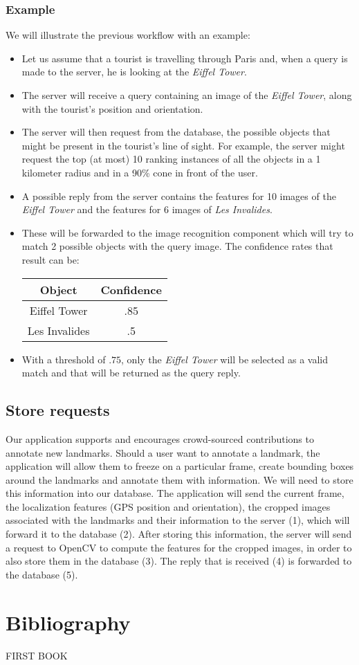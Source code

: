 \documentclass[a4paper,onecolumn,oneside,titlepage,11pt]{article}
\begin{document}
\subsubsection*{Example}
We will illustrate the previous workflow with an example:
\begin{itemize}
	\item Let us assume that a tourist is travelling through Paris and, when a query is made to the server, he is looking at the \emph{Eiffel Tower}.
	\item The server will receive a query containing an image of the \emph{Eiffel Tower}, along with the tourist's position and orientation. 
	\item The server will then request from the database, the possible objects that might be present in the tourist's line of sight. For example, the server might request the top (at most) 10 ranking instances of all the objects in a 1 kilometer radius and in a 90\% cone in front of the user.
	\item A possible reply from the server contains the features for 10 images of the \emph{Eiffel Tower} and the features for 6 images of \emph{Les Invalides}.
	\item These will be forwarded to the image recognition component which will try to match 2 possible objects with the query image. The confidence rates that result can be:
		\begin{center}
			\begin{tabular}{|c|c|}
				\hline
				\textbf{Object} & \textbf{Confidence}\\
				\hline
				Eiffel Tower & .85\\
				Les Invalides & .5\\
				\hline
			\end{tabular}
		\end{center}
	\item With a threshold of $.75$, only the \emph{Eiffel Tower} will be selected as a valid match and that will be returned as the query reply.
\end{itemize}

\subsection{Store requests}
Our application supports and encourages crowd-sourced contributions to annotate new landmarks. Should a user want to annotate a landmark, the application will allow them to freeze on a particular frame, create  bounding boxes around the landmarks and annotate them with information. We will need to store this information into our database.
The application will send the current frame, the localization features (GPS position and orientation), the cropped images associated with the landmarks and their information to the server (1), which will forward it to the database (2). After storing this information, the server will send a request to OpenCV to compute the features for the cropped images, in order to also store them in the database (3). The reply that is received (4) is forwarded to the database (5).

\section{Bibliography}
\begin{thebibliography}{99}
FIRST BOOK
\end{thebibliography}
\end{document}
